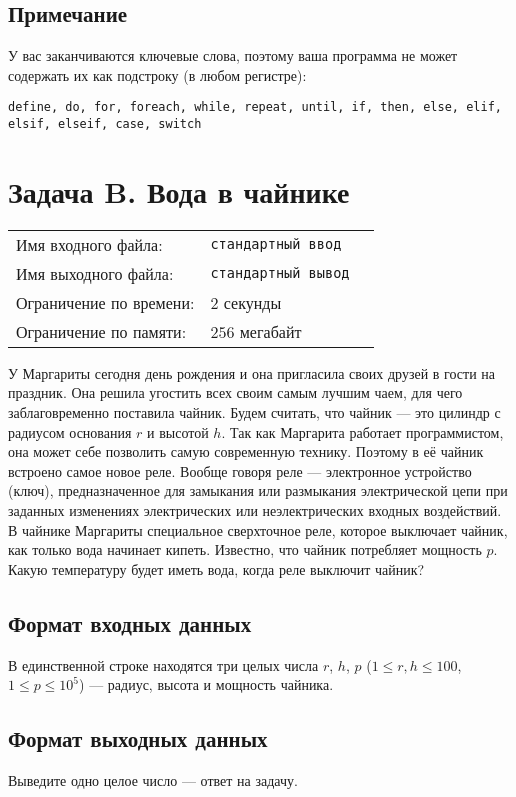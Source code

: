 \documentclass[12pt]{scrartcl}
\newcommand{\inputFile}{стандартный ввод}
\newcommand{\outputFile}{стандартный вывод}
\begin{document}
\subsection*{Примечание}
У вас заканчиваются ключевые слова, поэтому ваша программа не может содержать их как подстроку (в любом регистре):

\texttt{define, do, for, foreach, while, repeat, until, if, then, else, elif, elsif, elseif, case, switch}


\newpage



\section*{Задача B. Вода в чайнике}

\begin{tabularx}{\textwidth}{l l X}
    Имя входного файла: & \texttt{\inputFile} \\
    Имя выходного файла: & \texttt{\outputFile} \\
    Ограничение по времени: & $2$ секунды \\
    Ограничение по памяти: & $256$ мегабайт \\
\end{tabularx}

У Маргариты сегодня день рождения и она пригласила своих друзей в гости на праздник.
Она решила угостить всех своим самым лучшим чаем, для чего заблаговременно поставила чайник.
Будем считать, что чайник --- это цилиндр с радиусом основания $r$ и высотой $h$.
Так как Маргарита работает программистом, она может себе позволить самую современную технику.
Поэтому в её чайник встроено самое новое реле. Вообще говоря реле --- электронное устройство (ключ),
предназначенное для замыкания или размыкания электрической цепи при заданных изменениях электрических
или неэлектрических входных воздействий. В чайнике Маргариты специальное сверхточное реле, которое
выключает чайник, как только вода начинает кипеть. Известно, что чайник потребляет мощность $p$.
Какую температуру будет иметь вода, когда реле выключит чайник?

\subsection*{Формат входных данных}
В единственной строке находятся три целых числа $r$, $h$, $p$ ($1 \le r, h \le 100$, $1 \le p \le 10^5$)
--- радиус, высота и мощность чайника.

\subsection*{Формат выходных данных}
Выведите одно целое число --- ответ на задачу.
\end{document}
